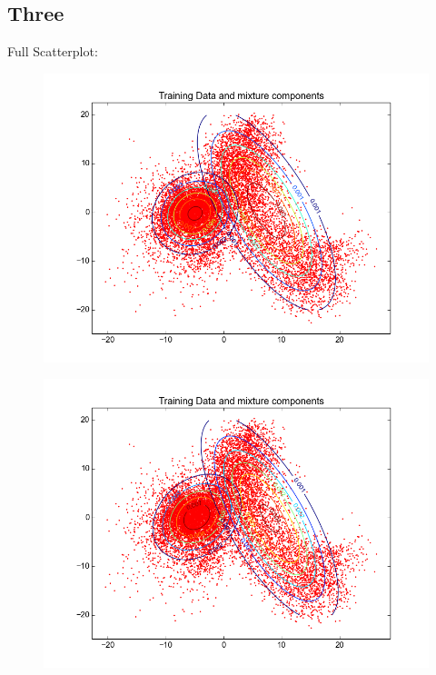 \documentclass[11pt,a4paper]{article}
\begin{document}
\subsection{Three}
Full Scatterplot: \\
\begin{minipage}[b]{0.25\textwidth}
\begin{figure}[H]
  \centering
  \includegraphics[width=.8\linewidth]{Figures/contours_digitthree0.png}
  \label{fig:sfig1}
\end{figure}%
\end{minipage}
\begin{minipage}[b]{0.25\textwidth}
\begin{figure}[H]
  \centering
  \includegraphics[width=.8\linewidth]{Figures/contours_digitthree5.png}

  \label{fig:sfig1}
\end{figure}%
\end{minipage}
\end{document}
